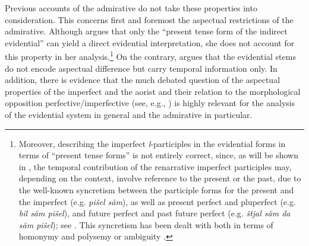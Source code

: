 \documentclass[output=paper]{langscibook}
\begin{document}
Previous accounts of the admirative do not take these properties into consideration. This concerns first and foremost the aspectual restrictions of the admirative. Although \citet[505]{Smirnova2013} argues that only the ``present tense form of the indirect evidential'' can yield a direct evidential interpretation, she does not account for this property in her analysis.\footnote{Moreover, describing the imperfect \textit{l}-participles in the evidential forms in terms of ``present tense forms'' is not entirely correct, since, as will be shown in , the temporal contribution of the renarrative imperfect participles may, depending on the context, involve reference to the present or the past, due to the well-known syncretism between the participle forms for the present and the imperfect (e.g. \textit{pišel săm}), as well as present perfect and pluperfect (e.g. \textit{bil săm pišel}), and future perfect and past future perfect (e.g. \textit{štjal săm da săm pišel}); see \citet[266]{Andrejcin1944}. This syncretism has been dealt with both in terms of homonymy \citep[e.g.][]{Andrejcin1944} and polysemy or ambiguity \citep[e.g.][]{Demina1959}.} On the contrary, \citeauthor{Smirnova2013} argues that the evidential stems do not encode aspectual difference but carry temporal information only. In addition, there is evidence that the much debated question  of the aspectual properties of the imperfect and the aorist and their relation to the morphological opposition perfective/imperfective (see, e.g., \citealt{Demina1976,Sonnenhauser2006}) is highly relevant for the analysis of the  evidential system in general and the admirative in particular.
\end{document}
